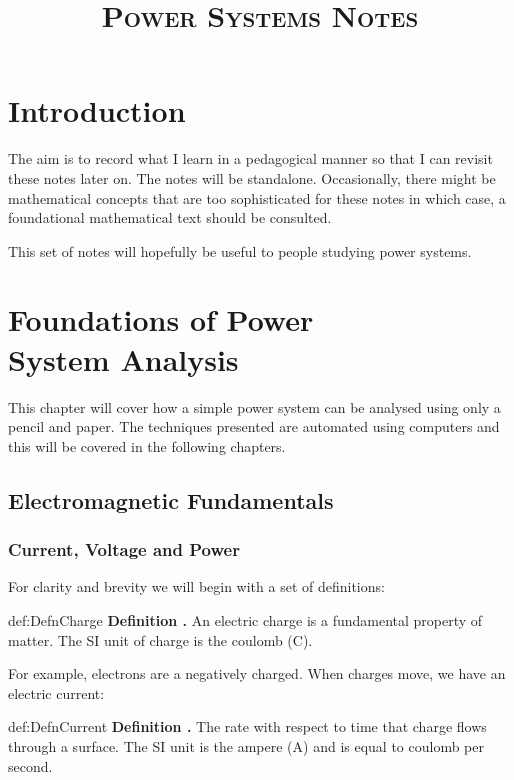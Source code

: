 \documentclass[14pt,a5paper,twoside]{book}
\title{\textsc{\huge Power Systems Notes}}
\author{}
\date{}
\newenvironment{myDefinition}[2]{ \begin{Definition}[adjusted title=#1]{}{#2} 
  \textbf{Definition \thetcbcounter.} \label{#2}}{\end{Definition}}
\begin{document}
\pagestyle{empty}
\maketitle
\cleardoublepage
\pagestyle{plain}

\chapter{Introduction}

The aim is to record what I learn in a pedagogical manner so that I can revisit these notes later on. The notes will be standalone. Occasionally, there might be mathematical concepts that are too sophisticated for these notes in which case, a foundational mathematical text should be consulted.

This set of notes will hopefully be useful to people studying power systems.

\chapter{Foundations of Power\\System Analysis}

This chapter will cover how a simple power system can be analysed using only a pencil and paper. The techniques presented are automated using computers and this will be covered in the following chapters.

\section{Electromagnetic Fundamentals}
\subsection{Current, Voltage and Power}

For clarity and brevity we will begin with a set of definitions:

\begin{myDefinition}{Electric Charge}{def:DefnCharge}
	An electric charge is a fundamental property of matter. The SI unit of charge is the coulomb (C).
\end{myDefinition}

For example, electrons are a negatively charged. When charges move, we have an electric current:

\begin{myDefinition}{Electric Current}{def:DefnCurrent}
	The rate with respect to time that charge flows through a surface. The SI unit is the ampere (A) and is equal to coulomb per second.
\end{myDefinition}
\end{document}
